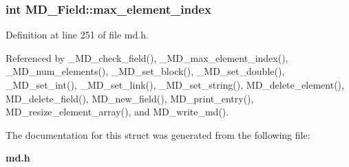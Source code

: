 \subsubsection{\setlength{\rightskip}{0pt plus 5cm}int \bf{MD\_\-Field::max\_\-element\_\-index}}\label{structMD__Field_2b91ce290e95ee2fc51af43930c4501f}




Definition at line 251 of file md.h.

Referenced by \_\-MD\_\-check\_\-field(), \_\-MD\_\-max\_\-element\_\-index(), \_\-MD\_\-num\_\-elements(), \_\-MD\_\-set\_\-block(), \_\-MD\_\-set\_\-double(), \_\-MD\_\-set\_\-int(), \_\-MD\_\-set\_\-link(), \_\-MD\_\-set\_\-string(), MD\_\-delete\_\-element(), MD\_\-delete\_\-field(), MD\_\-new\_\-field(), MD\_\-print\_\-entry(), MD\_\-resize\_\-element\_\-array(), and MD\_\-write\_\-md().

The documentation for this struct was generated from the following file:\begin{CompactItemize}
\item 
\bf{md.h}\end{CompactItemize}
